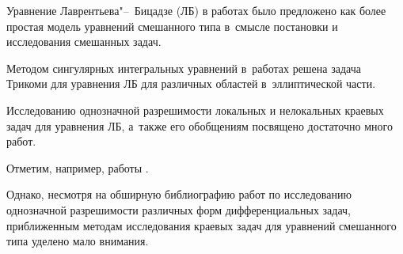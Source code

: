 
\date{}








\renewcommand{\JournalDataOnline}{\displaydate{balkizove}}





\makerutitle

















Уравнение Лаврентьева"--~Бицадзе (ЛБ) в работах \cite{balk:c1, balk:c2}  было предложено как более простая модель уравнений смешанного типа в~смысле постановки и исследования смешанных задач. 

Методом сингулярных интегральных уравнений в~работах \cite{balk:c1, balk:c2, balk:c3, balk:c4, balk:c5, balk:c6} решена задача Трикоми для уравнения ЛБ для различных областей в~эллиптической части.

Исследованию однозначной разрешимости локальных и нелокальных краевых задач для уравнения ЛБ, а~также его обобщениям посвящено достаточно много работ. 

Отметим, например, работы \cite{balk:c7, balk:c8, balk:c9, balk:c10, balk:c11, balk:c12, balk:c13}.

Однако, несмотря на обширную библиографию работ по исследованию однозначной разрешимости различных форм дифференциальных задач, приближенным методам исследования краевых задач для уравнений смешанного типа уделено мало внимания. 

